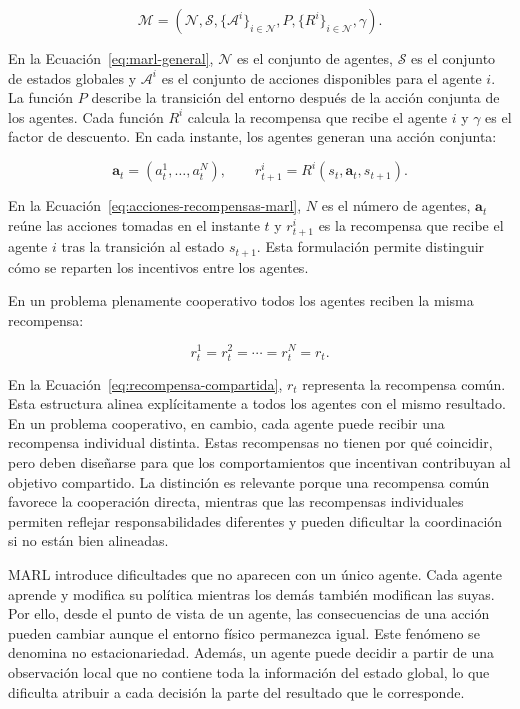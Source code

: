 \begin{equation}
\mathcal{M}=\left(\mathcal{N},\mathcal{S},\{\mathcal{A}^{i}\}_{i\in\mathcal{N}},P,\{R^{i}\}_{i\in\mathcal{N}},\gamma\right).
\label{eq:marl-general}
\end{equation}

En la Ecuación~\ref{eq:marl-general}, $\mathcal{N}$ es el conjunto de agentes, $\mathcal{S}$ es el conjunto de estados globales y $\mathcal{A}^{i}$ es el conjunto de acciones disponibles para el agente $i$. La función $P$ describe la transición del entorno después de la acción conjunta de los agentes. Cada función $R^{i}$ calcula la recompensa que recibe el agente $i$ y $\gamma$ es el factor de descuento. En cada instante, los agentes generan una acción conjunta:

\begin{equation}
\mathbf{a}_{t}=\left(a_t^1,\ldots,a_t^N\right),
\qquad
r_{t+1}^{i}=R^{i}\left(s_t,\mathbf{a}_{t},s_{t+1}\right).
\label{eq:acciones-recompensas-marl}
\end{equation}

En la Ecuación~\ref{eq:acciones-recompensas-marl}, $N$ es el número de agentes, $\mathbf{a}_{t}$ reúne las acciones tomadas en el instante $t$ y $r_{t+1}^{i}$ es la recompensa que recibe el agente $i$ tras la transición al estado $s_{t+1}$. Esta formulación permite distinguir cómo se reparten los incentivos entre los agentes.

En un problema plenamente cooperativo todos los agentes reciben la misma recompensa:

\begin{equation}
r_{t}^{1}=r_{t}^{2}=\cdots=r_{t}^{N}=r_t.
\label{eq:recompensa-compartida}
\end{equation}

\clearpage

En la Ecuación~\ref{eq:recompensa-compartida}, $r_t$ representa la recompensa común. Esta estructura alinea explícitamente a todos los agentes con el mismo resultado. En un problema cooperativo, en cambio, cada agente puede recibir una recompensa individual distinta. Estas recompensas no tienen por qué coincidir, pero deben diseñarse para que los comportamientos que incentivan contribuyan al objetivo compartido. La distinción es relevante porque una recompensa común favorece la cooperación directa, mientras que las recompensas individuales permiten reflejar responsabilidades diferentes y pueden dificultar la coordinación si no están bien alineadas.

MARL introduce dificultades que no aparecen con un único agente. Cada agente aprende y modifica su política mientras los demás también modifican las suyas. Por ello, desde el punto de vista de un agente, las consecuencias de una acción pueden cambiar aunque el entorno físico permanezca igual. Este fenómeno se denomina no estacionariedad. Además, un agente puede decidir a partir de una observación local que no contiene toda la información del estado global, lo que dificulta atribuir a cada decisión la parte del resultado que le corresponde.

